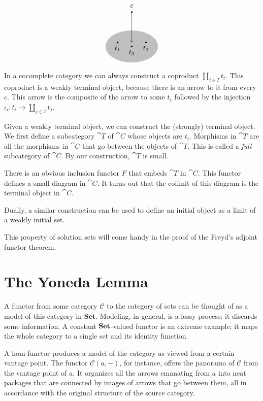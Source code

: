 \documentclass[DaoFP]{subfiles}
\begin{document}
\[
\begin{tikzpicture}
        \filldraw (0, 1.5) circle (1pt);
        \node at (0, 1.8) {$c$};
        
\filldraw[fill=gray!50, draw=white] (0, -0.2) ellipse (1.3 and 0.8);
        \filldraw (-0.7, 0) circle (1pt);
        \node at (-0.7, -0.3) {$t_1$};
        \filldraw (0.7, 0) circle (1pt);
        \node at (0.7, -0.3) {$t_2$};
        \filldraw (0, -0.2) circle (1pt);
        \node at (0, -0.5) {$t_3$};
        
    	\draw[->] (0, 1.5) -- (0, 0);
\end{tikzpicture}
\]

In a cocomplete category we can always construct a coproduct $\coprod_{i \in I} t_i$. This coproduct is a weakly terminal object, because there is an arrow to it from every $c$. This arrow is the composite of the arrow to some $t_i$ followed by the injection $\iota_i \colon t_i \to \coprod_{j \in I} t_j$.

Given a weakly terminal object, we can construct the (strongly) terminal object. We first define a subcategory $\cat T$ of $\cat C$ whose objects are $t_i$. Morphisms in $\cat T$ are all the morphisms in $\cat C$ that go between the objects of $\cat T$. This is called a \emph{full} subcategory of $\cat C$. By our construction, $\cat T$ is small.

There is an obvious inclusion functor $F$ that embeds $\cat T$ in $\cat C$. This functor defines a small diagram in $\cat C$. It turns out that the colimit of this diagram is the terminal object in $\cat C$.

Dually, a similar construction can be used to define an initial object as a limit of a weakly initial set.

This property of solution sets will come handy in the proof of the Freyd's adjoint functor theorem.

\section{The Yoneda Lemma}

A functor from some category $\mathcal{C}$ to the category of sets can be thought of as a model of this category in $\mathbf{Set}$. Modeling, in general, is a lossy process: it discards some information. A constant $\mathbf{Set}$-valued functor is an extreme example: it maps the whole category to a single set and its identity function. 

A hom-functor produces a model of the category as viewed from a certain vantage point. The functor $\mathcal{C}(a, -)$, for instance, offers the panorama of $\mathcal{C}$ from the vantage point of $a$. It organizes all the arrows emanating from $a$ into neat packages that are connected by images of arrows that go between them, all in accordance with the original structure of the source category. 
\end{document}
